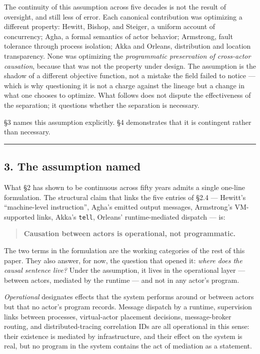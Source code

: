 \documentclass[
]{article}
\let\origtexttt\texttt%
\renewcommand{\texttt}[1]{\origtexttt{\seqsplit{#1}}}%
\let\texttt\origtexttt%
\begin{document}
The continuity of this assumption across five decades is not the result
of oversight, and still less of error. Each canonical contribution was
optimizing a different property: Hewitt, Bishop, and Steiger, a uniform
account of concurrency; Agha, a formal semantics of actor behavior;
Armstrong, fault tolerance through process isolation; Akka and Orleans,
distribution and location transparency. None was optimizing the
\emph{programmatic preservation of cross-actor causation}, because that
was not the property under design. The assumption is the shadow of a
different objective function, not a mistake the field failed to notice
--- which is why questioning it is not a charge against the lineage but
a change in what one chooses to optimize. What follows does not dispute
the effectiveness of the separation; it questions whether the separation
is necessary.

§3 names this assumption explicitly. §4 demonstrates that it is
contingent rather than necessary.

\begin{center}\rule{0.5\linewidth}{0.5pt}\end{center}

\subsection{3. The assumption named}\label{the-assumption-named}

What §2 has shown to be continuous across fifty years admits a single
one-line formulation. The structural claim that links the five entries
of §2.4 --- Hewitt's ``machine-level instruction'', Agha's emitted
output messages, Armstrong's VM-supported links, Akka's \texttt{tell},
Orleans' runtime-mediated dispatch --- is:

\begin{quote}
\textbf{Causation between actors is operational, not programmatic.}
\end{quote}

The two terms in the formulation are the working categories of the rest
of this paper. They also answer, for now, the question that opened it:
\emph{where does the causal sentence live?} Under the assumption, it
lives in the operational layer --- between actors, mediated by the
runtime --- and not in any actor's program.

\emph{Operational} designates effects that the system performs around or
between actors but that no actor's program records. Message dispatch by
a runtime, supervision links between processes, virtual-actor placement
decisions, message-broker routing, and distributed-tracing correlation
IDs are all operational in this sense: their existence is mediated by
infrastructure, and their effect on the system is real, but no program
in the system contains the act of mediation as a statement.
\end{document}
